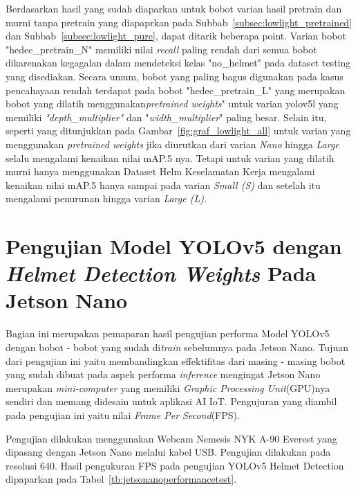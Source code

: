   \par Berdasarkan hasil yang sudah diaparkan untuk bobot varian hasil 
  pretrain dan murni tanpa pretrain yang diapaprkan pada Subbab~\ref{subsec:lowlight_pretrained} 
  dan Subbab~\ref{subsec:lowlight_pure}, dapat ditarik beberapa point. Varian bobot "hedec\_pretrain\_N"
  memiliki nilai \emph{recall} paling rendah dari semua bobot dikarenakan kegagalan dalam mendeteksi
  kelas "no\_helmet" pada dataset testing yang disediakan. Secara umum, bobot yang paling bagus digunakan
  pada kasus pencahayaan rendah terdapat pada bobot "hedec\_pretrain\_L" yang merupakan
  bobot yang dilatih menggunakan\emph{pretrained weights}" untuk varian yolov5l yang memiliki
  \emph{"depth\_multiplier"} dan "\emph{width\_multiplier}" paling besar. Selain itu, seperti yang
  ditunjukkan pada Gambar~\ref{fig:graf_lowlight_all} untuk varian yang menggunakan
  \emph{pretrained weights} jika diurutkan dari varian \emph{Nano} hingga \emph{Large} selalu mengalami
  kenaikan nilai mAP.5 nya. Tetapi untuk varian yang dilatih murni hanya menggunakan Dataset Helm Keselamatan Kerja
  mengalami kenaikan nilai mAP.5 hanya sampai pada varian \emph{Small (S)} dan setelah itu mengalami penurunan hingga varian \emph{Large (L)}.



\section{Pengujian Model YOLOv5 dengan \emph{Helmet Detection Weights} Pada Jetson Nano}
\label{sec:jetsonnano_hedectest}

\par Bagian ini merupakan pemaparan hasil pengujian performa Model YOLOv5 dengan bobot - bobot yang sudah di\emph{train}
sebelumnya pada Jetson Nano. Tujuan dari pengujian ini yaitu membandingkan effektifitas dari masing - masing
bobot yang sudah dibuat pada aspek performa \emph{inference} mengingat Jetson Nano merupakan \emph{mini-computer} yang memiliki
\emph{Graphic Processing Unit}(GPU)nya sendiri dan memang didesain untuk aplikasi AI IoT. Pengujuran yang diambil pada pengujian ini
yaitu nilai \emph{Frame Per Second}(FPS).

 
\par Pengujian dilakukan menggunakan Webcam Nemesis NYK A-90 Everest yang dipasang dengan Jetson Nano melalui kabel USB. 
Pengujian dilakukan pada resolusi 640. Hasil pengukuran FPS pada pengujian YOLOv5 Helmet Detection dipaparkan pada Tabel~\ref{tb:jetsonanoperformancetest}.



